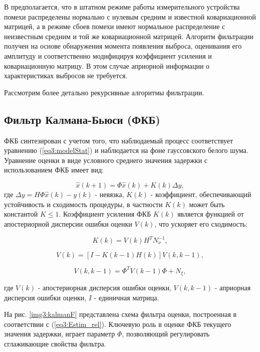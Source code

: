 В \cite{Klekis} предполагается, что в штатном режиме работы измерительного устройства помехи распределены нормально с нулевым средним и известной ковариационной матрицей, а в режиме сбоев помехи имеют нормальное распределение с неизвестным средним и той же ковариационной матрицей.
Алгоритм фильтрации получен на основе обнаружения момента появления выброса, оценивания его амплитуду и соответственно модифицируя коэффициент усиления и ковариационную матрицу. В этом случае априорной информации о характеристиках выбросов не требуется.  

Рассмотрим более детально рекурсивные алгоритмы фильтрации.


\subsection{Фильтр Калмана-Бьюси (ФКБ)}\label{FKB}
 ФКБ синтезирован с учетом того, что наблюдаемый процесс соответствует уравнению (\ref{eq3:modelStat}) и наблюдается на фоне гауссовского белого шума.
 Уравнение оценки в виде условного среднего значения задержки с использованием ФКБ имеет вид:


\begin{equation}\label{eq3:Estim_rel}
\hat{x}(k+1)=\Phi\hat{x}(k)+K(k)\Delta y,
\end{equation}
\noindent где $\Delta y=H\Phi\hat{x}(k)-y(k)$ - невязка, $K(k)$ - коэффициент, обеспечивающий устойчивость и сходимость процедуры, в частности $K(k)$ может быть константой $K\leq1$. 
Коэффициент усиления ФКБ $K(k)$ является функцией от апостериорной дисперсии ошибки оценки $V(k)$, что ускоряет его сходимость:

\begin{equation}\label{eq3:K}
K(k)=V(k)H^TN_{\nu}^{-1},
\end{equation}
 
\begin{equation}\label{eq3:V}
V(k)=[I-K(k-1)H(k)]V(k,k-1),
\end{equation}


\begin{equation}\label{eq3:Vkk-1}
V(k,k-1)=\Phi^TV(k-1)\Phi+N_\xi,
\end{equation}

\noindent где $V(k)$ - апостериорная дисперсия ошибки оценки, $V(k,k-1)$ - априорная дисперсия ошибки оценки, $I$ - единичная матрица.

На рис. \ref{img3:kalmanF} представлена схема фильтра оценки, построенная в соответствии с (\ref{eq3:Estim_rel}). Ключевую роль в оценке ФКБ текущего значения задержки, играет параметр $\Phi$, позволяющий регулировать сглаживающие свойства фильтра. 

